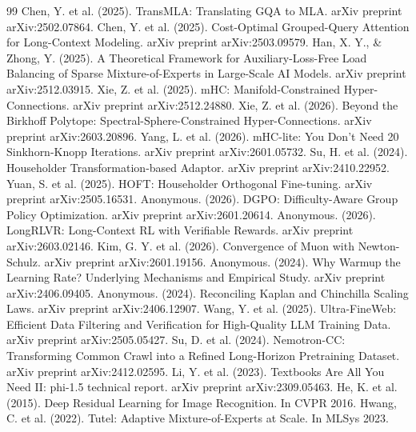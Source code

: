 \documentclass[11pt,twocolumn]{article}
\begin{document}
\begin{thebibliography}{99}
 Chen, Y. et al. (2025). TransMLA: Translating GQA to MLA. arXiv preprint arXiv:2502.07864.
 Chen, Y. et al. (2025). Cost-Optimal Grouped-Query Attention for Long-Context Modeling. arXiv preprint arXiv:2503.09579.
 Han, X. Y., \& Zhong, Y. (2025). A Theoretical Framework for Auxiliary-Loss-Free Load Balancing of Sparse Mixture-of-Experts in Large-Scale AI Models. arXiv preprint arXiv:2512.03915.
 Xie, Z. et al. (2025). mHC: Manifold-Constrained Hyper-Connections. arXiv preprint arXiv:2512.24880.
 Xie, Z. et al. (2026). Beyond the Birkhoff Polytope: Spectral-Sphere-Constrained Hyper-Connections. arXiv preprint arXiv:2603.20896.
 Yang, L. et al. (2026). mHC-lite: You Don't Need 20 Sinkhorn-Knopp Iterations. arXiv preprint arXiv:2601.05732.
 Su, H. et al. (2024). Householder Transformation-based Adaptor. arXiv preprint arXiv:2410.22952.
 Yuan, S. et al. (2025). HOFT: Householder Orthogonal Fine-tuning. arXiv preprint arXiv:2505.16531.
 Anonymous. (2026). DGPO: Difficulty-Aware Group Policy Optimization. arXiv preprint arXiv:2601.20614.
 Anonymous. (2026). LongRLVR: Long-Context RL with Verifiable Rewards. arXiv preprint arXiv:2603.02146.
 Kim, G. Y. et al. (2026). Convergence of Muon with Newton-Schulz. arXiv preprint arXiv:2601.19156.
 Anonymous. (2024). Why Warmup the Learning Rate? Underlying Mechanisms and Empirical Study. arXiv preprint arXiv:2406.09405.
 Anonymous. (2024). Reconciling Kaplan and Chinchilla Scaling Laws. arXiv preprint arXiv:2406.12907.
 Wang, Y. et al. (2025). Ultra-FineWeb: Efficient Data Filtering and Verification for High-Quality LLM Training Data. arXiv preprint arXiv:2505.05427.
 Su, D. et al. (2024). Nemotron-CC: Transforming Common Crawl into a Refined Long-Horizon Pretraining Dataset. arXiv preprint arXiv:2412.02595.
 Li, Y. et al. (2023). Textbooks Are All You Need II: phi-1.5 technical report. arXiv preprint arXiv:2309.05463.
 He, K. et al. (2015). Deep Residual Learning for Image Recognition. In CVPR 2016.
 Hwang, C. et al. (2022). Tutel: Adaptive Mixture-of-Experts at Scale. In MLSys 2023.
\end{thebibliography}
\end{document}

